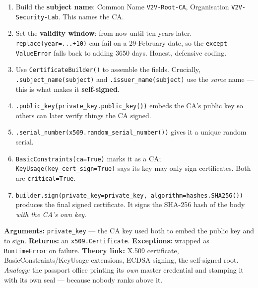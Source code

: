 \documentclass[11pt,a4paper]{article}
\begin{document}
\begin{enumerate}
  \item Build the \textbf{subject name}: Common Name \texttt{V2V-Root-CA},
        Organisation \texttt{V2V-Security-Lab}. This names the CA.
  \item Set the \textbf{validity window}: from now until ten years later.
        \texttt{replace(year=...+10)} can fail on a 29-February date, so the
        \texttt{except ValueError} falls back to adding 3650 days. Honest,
        defensive coding.
  \item Use \texttt{CertificateBuilder()} to assemble the fields. Crucially,
        \texttt{.subject\_name(subject)} and \texttt{.issuer\_name(subject)} use
        the \emph{same} name --- this is what makes it \textbf{self-signed}.
  \item \texttt{.public\_key(private\_key.public\_key())} embeds the CA's public
        key so others can later verify things the CA signed.
  \item \texttt{.serial\_number(x509.random\_serial\_number())} gives it a unique
        random serial.
  \item \texttt{BasicConstraints(ca=True)} marks it as a CA;
        \texttt{KeyUsage(key\_cert\_sign=True)} says its key may only sign
        certificates. Both are \texttt{critical=True}.
  \item \texttt{builder.sign(private\_key=private\_key,
        algorithm=hashes.SHA256())} produces the final signed certificate. It
        signs the SHA-256 hash of the body \emph{with the CA's own key}.
\end{enumerate}
\textbf{Arguments:} \texttt{private\_key} --- the CA key used both to embed the
public key and to sign. \textbf{Returns:} an \texttt{x509.Certificate}.
\textbf{Exceptions:} wrapped as \texttt{RuntimeError} on failure.
\textbf{Theory link:} X.509 certificate, BasicConstraints/KeyUsage extensions,
ECDSA signing, the self-signed root. \emph{Analogy:} the passport office printing
its \emph{own} master credential and stamping it with its own seal --- because
nobody ranks above it.
\end{document}
